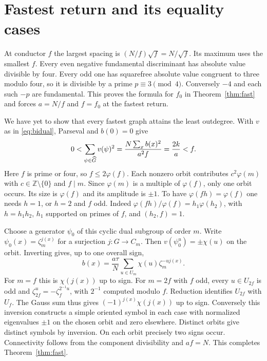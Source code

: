 \documentclass[11pt]{article}
\newcommand{\Z}{\mathbb Z}\newcommand{\Q}{\mathbb Q}\newcommand{\C}{\mathbb C}
\begin{document}
\section{Fastest return and its equality cases}
At conductor $f$ the largest spacing is $(N/f)\sqrt f=N/\sqrt f$. Its maximum uses the smallest $f$. Every even negative fundamental discriminant has absolute value divisible by four. Every odd one has squarefree absolute value congruent to three modulo four, so it is divisible by a prime $p\equiv3\pmod4$. Conversely $-4$ and each such $-p$ are fundamental. This proves the formula for $f_0$ in Theorem~\ref{thm:fast} and forces $a=N/f$ and $f=f_0$ at the fastest return.

We have yet to show that every fastest graph attains the least outdegree. With $v$ as in \eqref{eq:bidual}, Parseval and $b(0)=0$ give
\[
       0<\sum_{\psi\in\widehat G}v(\psi)^2
         =\frac{N\sum_x b(x)^2}{a^2 f}=\frac{2k}{a}<f.
\]
Here $f$ is prime or four, so $f\le2\varphi(f)$. Each nonzero orbit contributes $c^2\varphi(m)$ with $c\in\Z\setminus\{0\}$ and $f\mid m$. Since $\varphi(m)$ is a multiple of $\varphi(f)$, only one orbit occurs. Its size is $\varphi(f)$ and its amplitude is $\pm1$. To have $\varphi(fh)=\varphi(f)$ one needs $h=1$, or $h=2$ and $f$ odd. Indeed $\varphi(fh)/\varphi(f)=h_1\varphi(h_2)$, with $h=h_1h_2$, $h_1$ supported on primes of $f$, and $(h_2,f)=1$.

Choose a generator $\psi_0$ of this cyclic dual subgroup of order $m$. Write $\psi_0(x)=\zeta_m^{j(x)}$ for a surjection $j:G\to C_m$. Then $v(\psi_0^u)=\pm\chi(u)$ on the orbit. Inverting gives, up to one overall sign,
\[
       b(x)=\frac{a\tau}{N}\sum_{u\in U_m}\chi(u)\zeta_m^{-u j(x)} .
\]
For $m=f$ this is $\chi(j(x))$ up to sign. For $m=2f$ with $f$ odd, every $u\in U_{2f}$ is odd and $\zeta_{2f}^u=-\zeta_f^{2^{-1}u}$, with $2^{-1}$ computed modulo $f$. Reduction identifies $U_{2f}$ with $U_f$. The Gauss sum thus gives $(-1)^{j(x)}\chi(j(x))$ up to sign. Conversely this inversion constructs a simple oriented symbol in each case with normalized eigenvalues $\pm1$ on the chosen orbit and zero elsewhere. Distinct orbits give distinct symbols by inversion. On each orbit precisely two signs occur. Connectivity follows from the component divisibility and $af=N$. This completes Theorem~\ref{thm:fast}.
\end{document}
